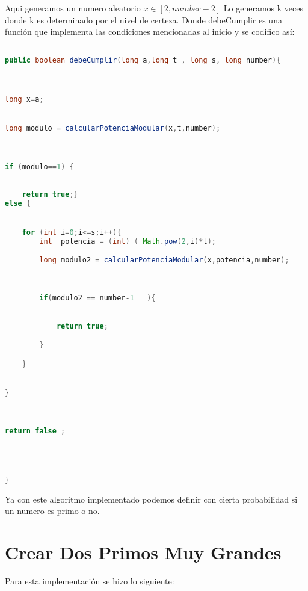 \documentclass[a4paper,10pt]{article}
\begin{document}
Aqui generamos un numero aleatorio $x \in [2,number-2]$ 
Lo generamos k veces donde k es determinado por el nivel de certeza.
Donde debeCumplir es una función que implementa las condiciones mencionadas al inicio y se codifico así:
\begin{lstlisting}[language=java]

public boolean debeCumplir(long a,long t , long s, long number){



long x=a;


long modulo = calcularPotenciaModular(x,t,number);
		


if (modulo==1) {

			
	return true;}
else {


	for (int i=0;i<=s;i++){
		int  potencia = (int) ( Math.pow(2,i)*t);

		long modulo2 = calcularPotenciaModular(x,potencia,number);

				

		if(modulo2 == number-1   ){ 
					

			return true;

		}

	}


}

		

return false ;




}

\end{lstlisting}


Ya con este algoritmo implementado podemos definir con cierta probabilidad si un numero es primo o no.


\section{Crear Dos Primos Muy Grandes}

Para esta implementación se hizo lo siguiente:
\end{document}
